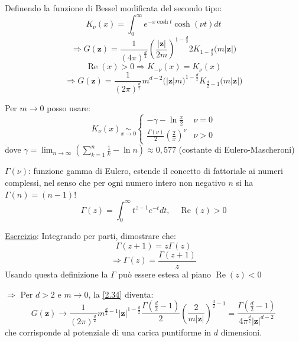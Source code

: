 \documentclass[a4paper,11pt]{report}
\newcommand{\z}{\boldsymbol{z}}
\begin{document}
Definendo la funzione di Bessel modificata del secondo tipo:
\begin{equation}
K_{\nu}(x)=\int_0^{\infty}e^{-x\cosh t}\cosh(\nu t) dt
\end{equation}
\[
\Rightarrow G(\z)=\frac{1}{(4\pi)^\frac{d}{2}}\left(\frac{|\z|}{2m}\right)^{1-\frac{d}{2}} 2 K_{1-\frac{d}{2}}\big(m|\z|\big)
\]
\[
\operatorname{Re}(x)>0 \Rightarrow K_{-\nu}(x)=K_{\nu}(x)
\]
\begin{equation}
\Rightarrow G(\z)=\frac{1}{(2\pi)^\frac{d}{2}}m^{d-2}\big(|\z|m\big)^{1-\frac{d}{2}} K_{\frac{d}{2}-1}\big(m|\z|\big)
\label{2.34}
\end{equation}

Per $m\to 0$ posso usare:
\begin{equation}
K_{\nu}(x)\underset{x \to 0}{\sim}
\begin{cases}
-\gamma-\ln \frac{x}{2} & \nu=0 \\
\frac{\Gamma(\nu)}{2}\left(\frac{2}{x}\right)^{\nu} & \nu >0
\end{cases}
\label{2.35}
\end{equation}
dove $\gamma=\lim_{n\to\infty}\left(\sum_{k=1}^{n}\frac{1}{k}-\ln n\right)\approx 0,577$ (costante di Eulero-Mascheroni)

$\Gamma(\nu)$: funzione gamma di Eulero, estende il concetto di fattoriale ai numeri complessi, nel senso che per ogni numero intero non negativo $n$ si ha $\Gamma (n)=(n-1)!$
\begin{equation}
\Gamma(z)=\int_0^{\infty}t^{z-1}e^{-t}dt,\quad \operatorname{Re}(z)>0
\end{equation}

\underline{Esercizio}: Integrando per parti, dimostrare che:
\begin{equation}
\Gamma(z+1)=z\Gamma(z)
\end{equation}
\[
\Rightarrow \Gamma(z)=\frac{\Gamma(z+1)}{z}
\]
Usando questa definizione la $\Gamma$ pu\`o essere estesa al piano $\operatorname{Re}(z)<0$

$\Rightarrow$ Per $d>2$ e $m\to 0$, la \eqref{2.34} diventa:
\begin{equation}
G(\z)\rightarrow \frac{1}{(2\pi)^\frac{d}{2}} m^{\frac{d}{2}-1}|\z|^{1-\frac{d}{2}}\frac{\Gamma(\frac{d}{2}-1)}{2}\left(\frac{2}{m|\z|}\right)^{\frac{d}{2}-1}=\frac{\Gamma(\frac{d}{2}-1)}{4\pi^\frac{d}{2}|\z|^{d-2}}
\end{equation}
che corrisponde al potenziale di una carica puntiforme in $d$ dimensioni.

\medskip
\end{document}
